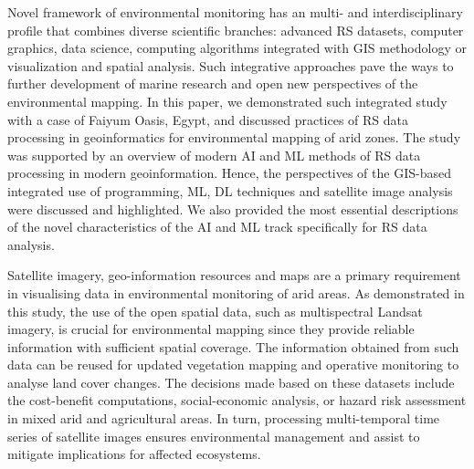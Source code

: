 \documentclass[final,5p,times,twocolumn]{elsarticle}
\numberwithin{table}{section}
\begin{document}
Novel framework of environmental monitoring has an multi- and interdisciplinary profile that combines diverse scientific branches: advanced RS datasets, computer graphics, data science, computing algorithms integrated with GIS methodology or visualization and spatial analysis. Such integrative approaches pave the ways to further development of marine research and open new perspectives of the environmental mapping. In this paper, we demonstrated such integrated study with a case of Faiyum Oasis, Egypt, and discussed practices of RS data processing in geoinformatics for environmental mapping of arid zones. The study was supported by an overview of modern AI and ML methods of RS data processing in modern geoinformation. Hence, the perspectives of the GIS-based integrated use of programming, ML, DL techniques and satellite image analysis were discussed and highlighted. We also provided the most essential descriptions of the novel characteristics of the AI and ML track specifically for RS data analysis.

Satellite imagery, geo-information resources and maps are a primary requirement in visualising data in environmental monitoring of arid areas. As demonstrated in this study, the use of the open spatial data, such as multispectral Landsat imagery, is crucial for environmental mapping since they provide reliable information with sufficient spatial coverage. The information obtained from such data can be reused for updated vegetation mapping and operative monitoring to analyse land cover changes. The decisions made based on these datasets include the cost-benefit computations, social-economic analysis, or hazard risk assessment in mixed arid and agricultural areas. In turn, processing multi-temporal time series of satellite images ensures environmental management and assist to mitigate implications for affected ecosystems.

\appendix

 


\end{document}
